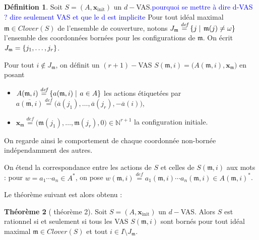 \documentclass[a4paper,final]{article}
\theoremstyle{definition}
\newtheorem{Theorem}{Théorème}
\newtheorem{Definition}[Theorem]{Définition}
\newcommand{\alain}[1]{\textcolor{blue}{#1}}
\newcommand{\set}[2]{\left\{#1\mathrel{\left|\vphantom{#1}\vphantom{#2}\right.}#2\right\}}
\newcommand{\os}[1]{\left\{\mathinner{#1}\right\}}
\newcommand{\defeq}{\ensuremath{\stackrel{\textit{def}}{=}}}
\newcommand{\N}{\ensuremath{\mathbb{N}}}
\newcommand{\clover}{\textit{Clover}}
\newcommand{\vect}[1]{\ensuremath{\mathbf{#1}}}
\newcommand{\xinit}{\ensuremath{\vect{x}_\text{init}}}
\newcommand{\valeur}[1]{\ensuremath{\overline{#1}}}
\begin{document}
\begin{Definition}
Soit $S=(A,\xinit)$ un $d-$VAS.\alain{pourquoi se mettre à dire d-VAS ? dire seulement VAS et que le d est implicite}
Pour tout idéal maximal $\mathfrak{m}\in\clover(S)$ de l'ensemble de couverture, notons $J_\mathfrak{m} \defeq \set{j}{\mathfrak{m}(j)\neq \omega}$ l'ensemble des coordonnées bornées pour les configurations de $\mathfrak{m}$.
On écrit $J_\mathfrak{m}=\os{j_1,\dots,j_r}$.

Pour tout $i\notin J_\mathfrak{m}$, on définit un $(r+1)-$VAS $S(\mathfrak{m},i) = \big(A(\mathfrak{m},i), \vect{x}_\mathfrak{m}\big)$ en posant
\begin{itemize}
    \item $A(\mathfrak{m},i) \defeq \set{a(\mathfrak{m},i)} {a\in A}$ 
    les actions étiquetées par $\valeur{a(\mathfrak{m},i)} \defeq \big(\valeur{a}(j_1), \dots, \valeur{a}(j_r), -\valeur{a}(i) \big)$,
    \item $\vect{x}_\mathfrak{m} \defeq \big(\mathfrak{m}(j_1), \dots, \mathfrak{m}(j_r), 0\big) \in \N^{r+1}$ la configuration initiale.
\end{itemize}
\end{Definition}

\noindent On regarde ainsi le comportement de chaque coordonnée non-bornée indépendamment des autres.

On étend la correspondance entre les actions de $S$ et celles de $S(\mathfrak{m},i)$ aux mots : 
pour $w = a_1\cdots a_n \in A^\ast$, on pose $w(\mathfrak{m},i) \defeq a_1(\mathfrak{m},i) \cdots a_n(\mathfrak{m},i) \in A(\mathfrak{m},i)^\ast$.

Le théorème suivant est alors obtenu :

\begin{Theorem}[\cite{giyo80} théorème 2]
    Soit $S=(A,\xinit)$ un $d-$VAS.
    Alors $S$ est rationnel si et seulement si 
    tous les VAS $S(\mathfrak{m},i)$ sont bornés pour tout idéal maximal $\mathfrak{m} \in \clover(S)$ et tout $i \in I \setminus J_\mathfrak{m}$.
\end{Theorem}
\end{document}
